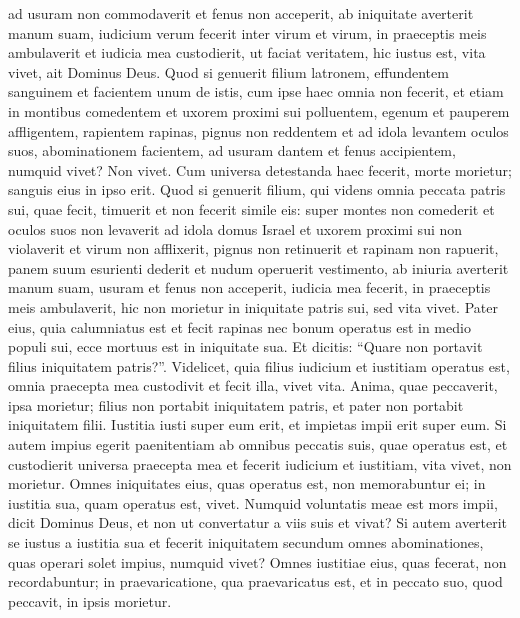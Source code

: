 \begin{biblechapter}
\begin{biblechapter}
\begin{biblechapter}
\begin{biblechapter}
\begin{biblechapter}
\begin{biblechapter}
\begin{biblechapter}
\begin{biblechapter}
\begin{biblechapter}
\begin{biblechapter}
\begin{biblechapter}
\begin{biblechapter}
\begin{biblechapter}
\begin{biblechapter}
\begin{biblechapter}
\begin{biblechapter}
\begin{biblechapter}
\begin{biblechapter}
\verse ad usuram non commodaverit et fenus non acceperit, ab iniquitate averterit manum suam, iudicium verum fecerit inter virum et virum, 
\verse in praeceptis meis ambulaverit et iudicia mea custodierit, ut faciat veritatem, hic iustus est, vita vivet, ait Dominus Deus.
 \verse Quod si genuerit filium latronem, effundentem sanguinem et facientem unum de istis, 
\verse cum ipse haec omnia non fecerit, et etiam in montibus comedentem et uxorem proximi sui polluentem, 
\verse egenum et pauperem affligentem, rapientem rapinas, pignus non reddentem et ad idola levantem oculos suos, abominationem facientem, 
\verse ad usuram dantem et fenus accipientem, numquid vivet? Non vivet. Cum universa detestanda haec fecerit, morte morietur; sanguis eius in ipso erit.
 \verse Quod si genuerit filium, qui videns omnia peccata patris sui, quae fecit, timuerit et non fecerit simile eis: 
\verse super montes non comederit et oculos suos non levaverit ad idola domus Israel et uxorem proximi sui non violaverit 
 \verse et virum non afflixerit, pignus non retinuerit et rapinam non rapuerit, panem suum esurienti dederit et nudum operuerit vestimento, 
\verse ab iniuria averterit manum suam, usuram et fenus non acceperit, iudicia mea fecerit, in praeceptis meis ambulaverit, hic non morietur in iniquitate patris sui, sed vita vivet. 
\verse Pater eius, quia calumniatus est et fecit rapinas nec bonum operatus est in medio populi sui, ecce mortuus est in iniquitate sua. 
\verse Et dicitis: “Quare non portavit filius iniquitatem patris?”. Videlicet, quia filius iudicium et iustitiam operatus est, omnia praecepta mea custodivit et fecit illa, vivet vita. 
\verse Anima, quae peccaverit, ipsa morietur; filius non portabit iniquitatem patris, et pater non portabit iniquitatem filii. Iustitia iusti super eum erit, et impietas impii erit super eum.
 \verse Si autem impius egerit paenitentiam ab omnibus peccatis suis, quae operatus est, et custodierit universa praecepta mea et fecerit iudicium et iustitiam, vita vivet, non morietur. 
\verse Omnes iniquitates eius, quas operatus est, non memorabuntur ei; in iustitia sua, quam operatus est, vivet. 
\verse Numquid voluntatis meae est mors impii, dicit Dominus Deus, et non ut convertatur a viis suis et vivat?
 \verse Si autem averterit se iustus a iustitia sua et fecerit iniquitatem secundum omnes abominationes, quas operari solet impius, numquid vivet? Omnes iustitiae eius, quas fecerat, non recordabuntur; in praevaricatione, qua praevaricatus est, et in peccato suo, quod peccavit, in ipsis morietur. 

\end{biblechapter}
\end{biblechapter}
\end{biblechapter}
\end{biblechapter}
\end{biblechapter}
\end{biblechapter}
\end{biblechapter}
\end{biblechapter}
\end{biblechapter}
\end{biblechapter}
\end{biblechapter}
\end{biblechapter}
\end{biblechapter}
\end{biblechapter}
\end{biblechapter}
\end{biblechapter}
\end{biblechapter}
\end{biblechapter}

